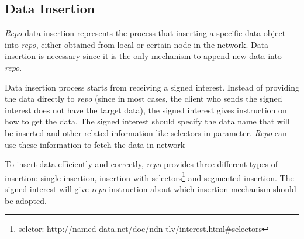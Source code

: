 \documentclass[conference]{IEEEtran}
\begin{document}
\subsection{Data Insertion}

\emph{Repo} data insertion represents the process that inserting a specific data object into \emph{repo}, either obtained from local or certain node in the network. Data insertion is necessary since it is the only mechanism to append new data into \emph{repo}.

Data insertion process starts from receiving a signed interest. Instead of providing the data directly to \emph{repo} (since in most cases, the client who sends the signed interest does not have the target data), the signed interest gives instruction on how to get the data. The signed interest should specify the data name that will be inserted and other related information like selectors in parameter. \emph{Repo} can use these information to fetch the data in network

To insert data efficiently and correctly, \emph{repo} provides three different types of insertion: single insertion, insertion with selectors\footnote{selctor: http://named-data.net/doc/ndn-tlv/interest.html\#selectors} and segmented insertion. The signed interest will give \emph{repo} instruction about which insertion mechanism should be adopted.
\end{document}
